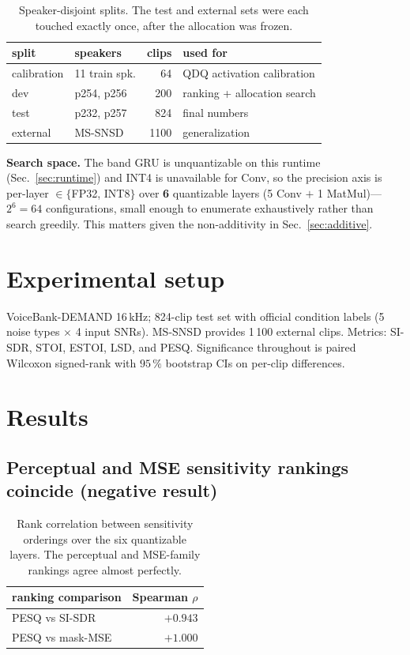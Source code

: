 \documentclass[conference]{IEEEtran}
\begin{document}
\begin{table}[t]
\centering
\caption{Speaker-disjoint splits. The test and external sets were each touched exactly once, after
the allocation was frozen.}
\label{tab:splits}
\begin{tabular}{llrl}
\toprule
split & speakers & clips & used for \\
\midrule
calibration & 11 train spk. & 64 & QDQ activation calibration \\
dev & p254, p256 & 200 & ranking + allocation search \\
test & p232, p257 & 824 & final numbers \\
external & MS-SNSD & 1100 & generalization \\
\bottomrule
\end{tabular}
\end{table}

\textbf{Search space.} The band GRU is unquantizable on this runtime (Sec.~\ref{sec:runtime}) and
INT4 is unavailable for Conv, so the precision axis is per-layer $\in \{$FP32, INT8$\}$ over
\textbf{6} quantizable layers (5 Conv $+$ 1 MatMul)---$2^6 = 64$ configurations, small enough to
enumerate exhaustively rather than search greedily. This matters given the non-additivity in
Sec.~\ref{sec:additive}.

\section{Experimental setup}

VoiceBank-DEMAND 16\,kHz; 824-clip test set with official condition labels (5 noise types
$\times$ 4 input SNRs). MS-SNSD provides 1\,100 external clips. Metrics: SI-SDR, STOI, ESTOI, LSD,
and PESQ. Significance throughout is paired Wilcoxon signed-rank with $95\,\%$ bootstrap CIs on
per-clip differences.

\section{Results}

\subsection{Perceptual and MSE sensitivity rankings coincide (negative result)}
\label{sec:negative}

\begin{table}[t]
\centering
\caption{Rank correlation between sensitivity orderings over the six quantizable layers. The
perceptual and MSE-family rankings agree almost perfectly.}
\label{tab:rankings}
\begin{tabular}{lr}
\toprule
ranking comparison & Spearman $\rho$ \\
\midrule
PESQ vs SI-SDR & $+0.943$ \\
PESQ vs mask-MSE & $\mathbf{+1.000}$ \\
\bottomrule
\end{tabular}
\end{table}
\end{document}

